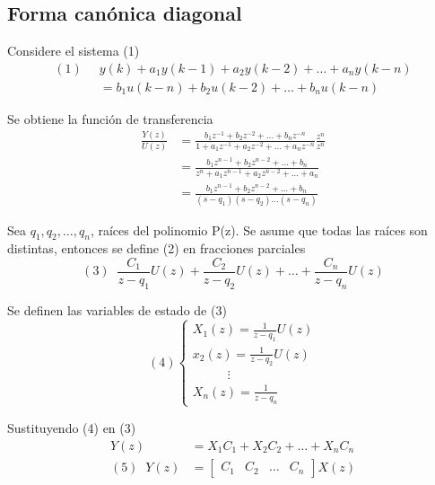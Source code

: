 \subsection{Forma canónica diagonal}

Considere el sistema (1)
\[
    \begin{split}
        (1) \;\; & y(k) + a_{1}y(k-1) + a_{2}y(k-2) + \ldots + a_{n}y(k-n) \\
            & = b_{1}u(k-n) + b_{2}u(k-2) + \ldots + b_{n}u(k-n)
    \end{split}
\]

Se obtiene la función de transferencia 
\[
    \begin{split}
        \frac{ Y(z) }{ U(z) } & = \frac{ b_{1}z^{-1} + b_{2}z^{-2} + \ldots + b_{n}z^{-n} }{ 1 + a_{1}z^{-1} + a_{2}z^{-2} + \ldots + a_{n}z^{-n} } \frac{ z^{n} }{ z^{n} } \\ \;\;
        & = \frac{b_{1}z^{n-1} + b_{2}z^{n-2} + \ldots + b_{n}}{ z^{n} + a_{1}z^{n-1} + a_{2}z^{n-2} + \ldots + a_{n} } \\
        & = \frac{ b_{1}z^{n-1} + b_{2}z^{n-2} + \ldots + b_{n} }{ (s-q_{1})(s-q_{2}) \ldots (s-q_{n}) }
    \end{split}
\]

Sea \( q_{1}, q_{2}, \ldots, q_{n} \), raíces del polinomio P(z). Se asume que todas las raíces son distintas, entonces se define (2) en fracciones parciales
\[
    (3) \;\;
    \frac{ C_{1} }{ z - q_{1} }U(z) + \frac{ C_{2} }{ z-q_{2} }U(z) + \ldots + \frac{ C_{n} }{ z - q_{n} }U(z)
\]

Se definen las variables de estado de (3)
\[(4)
    \left\{
        \begin{array}{lll}
            X_{1}(z) = \frac{ 1 }{ z - q_{1} }U(z) \\ 
            x_{2}(z) = \frac{ 1 }{ z - q_{2} }U(z) \\
            \;\;\;\;\;\;\;\;\;\; \vdots \\
            X_{n}(z) = \frac{ 1 }{ z - q_{n} }
        \end{array}
    \right.
\]

Sustituyendo (4) en (3)
\[
    \begin{split}
        Y(z) & = X_{1}C_{1} + X_{2}C_{2} + \ldots + X_{n}C_{n} \\
        (5) \;\; Y(z) & = 
        \begin{bmatrix}
            C_{1} & C_{2} & \ldots & C_{n} 
        \end{bmatrix} X(z)
    \end{split}
\]

